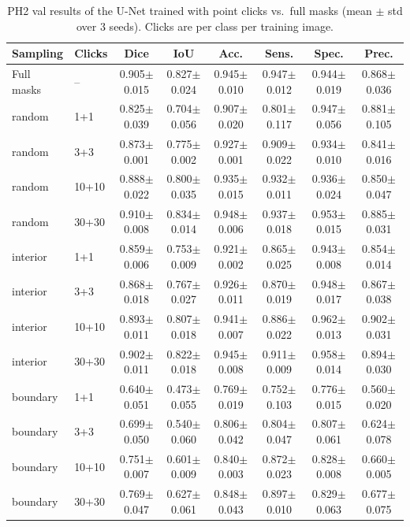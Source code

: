 \begin{table}[t]
\centering\small
\begin{tabular}{llcccccc}
\toprule
Sampling & Clicks & Dice & IoU & Acc. & Sens. & Spec. & Prec. \\ \midrule
Full masks & -- & 0.905$\pm$0.015 & 0.827$\pm$0.024 & 0.945$\pm$0.010 & 0.947$\pm$0.012 & 0.944$\pm$0.019 & 0.868$\pm$0.036 \\ \midrule
random & 1+1 & 0.825$\pm$0.039 & 0.704$\pm$0.056 & 0.907$\pm$0.020 & 0.801$\pm$0.117 & 0.947$\pm$0.056 & 0.881$\pm$0.105 \\
random & 3+3 & 0.873$\pm$0.001 & 0.775$\pm$0.002 & 0.927$\pm$0.001 & 0.909$\pm$0.022 & 0.934$\pm$0.010 & 0.841$\pm$0.016 \\
random & 10+10 & 0.888$\pm$0.022 & 0.800$\pm$0.035 & 0.935$\pm$0.015 & 0.932$\pm$0.011 & 0.936$\pm$0.024 & 0.850$\pm$0.047 \\
random & 30+30 & 0.910$\pm$0.008 & 0.834$\pm$0.014 & 0.948$\pm$0.006 & 0.937$\pm$0.018 & 0.953$\pm$0.015 & 0.885$\pm$0.031 \\ \midrule
interior & 1+1 & 0.859$\pm$0.006 & 0.753$\pm$0.009 & 0.921$\pm$0.002 & 0.865$\pm$0.025 & 0.943$\pm$0.008 & 0.854$\pm$0.014 \\
interior & 3+3 & 0.868$\pm$0.018 & 0.767$\pm$0.027 & 0.926$\pm$0.011 & 0.870$\pm$0.019 & 0.948$\pm$0.017 & 0.867$\pm$0.038 \\
interior & 10+10 & 0.893$\pm$0.011 & 0.807$\pm$0.018 & 0.941$\pm$0.007 & 0.886$\pm$0.022 & 0.962$\pm$0.013 & 0.902$\pm$0.031 \\
interior & 30+30 & 0.902$\pm$0.011 & 0.822$\pm$0.018 & 0.945$\pm$0.008 & 0.911$\pm$0.009 & 0.958$\pm$0.014 & 0.894$\pm$0.030 \\ \midrule
boundary & 1+1 & 0.640$\pm$0.051 & 0.473$\pm$0.055 & 0.769$\pm$0.019 & 0.752$\pm$0.103 & 0.776$\pm$0.015 & 0.560$\pm$0.020 \\
boundary & 3+3 & 0.699$\pm$0.050 & 0.540$\pm$0.060 & 0.806$\pm$0.042 & 0.804$\pm$0.047 & 0.807$\pm$0.061 & 0.624$\pm$0.078 \\
boundary & 10+10 & 0.751$\pm$0.007 & 0.601$\pm$0.009 & 0.840$\pm$0.003 & 0.872$\pm$0.023 & 0.828$\pm$0.008 & 0.660$\pm$0.005 \\
boundary & 30+30 & 0.769$\pm$0.047 & 0.627$\pm$0.061 & 0.848$\pm$0.043 & 0.897$\pm$0.010 & 0.829$\pm$0.063 & 0.677$\pm$0.075 \\
\bottomrule
\end{tabular}
\caption{PH2 val results of the U-Net trained with point clicks vs.\ full masks (mean $\pm$ std over 3 seeds). Clicks are per class per training image.}
\label{tab:clicks_val}
\end{table}
